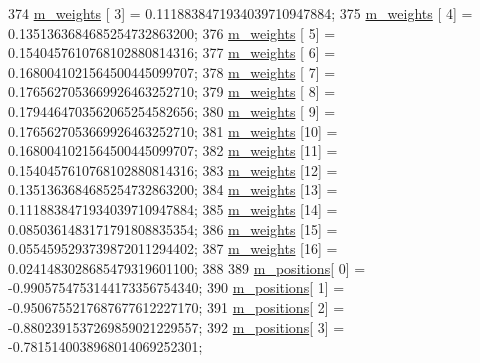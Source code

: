 \begin{DoxyCode}
374       \hyperlink{class_q_u_e_s_o_1_1_base1_d_quadrature_a7117fec020a8098d1c22b604268bad93}{m\_weights}  [ 3] =  0.1118838471934039710947884;
375       \hyperlink{class_q_u_e_s_o_1_1_base1_d_quadrature_a7117fec020a8098d1c22b604268bad93}{m\_weights}  [ 4] =  0.1351363684685254732863200;
376       \hyperlink{class_q_u_e_s_o_1_1_base1_d_quadrature_a7117fec020a8098d1c22b604268bad93}{m\_weights}  [ 5] =  0.1540457610768102880814316;
377       \hyperlink{class_q_u_e_s_o_1_1_base1_d_quadrature_a7117fec020a8098d1c22b604268bad93}{m\_weights}  [ 6] =  0.1680041021564500445099707;
378       \hyperlink{class_q_u_e_s_o_1_1_base1_d_quadrature_a7117fec020a8098d1c22b604268bad93}{m\_weights}  [ 7] =  0.1765627053669926463252710;
379       \hyperlink{class_q_u_e_s_o_1_1_base1_d_quadrature_a7117fec020a8098d1c22b604268bad93}{m\_weights}  [ 8] =  0.1794464703562065254582656;
380       \hyperlink{class_q_u_e_s_o_1_1_base1_d_quadrature_a7117fec020a8098d1c22b604268bad93}{m\_weights}  [ 9] =  0.1765627053669926463252710;
381       \hyperlink{class_q_u_e_s_o_1_1_base1_d_quadrature_a7117fec020a8098d1c22b604268bad93}{m\_weights}  [10] =  0.1680041021564500445099707;
382       \hyperlink{class_q_u_e_s_o_1_1_base1_d_quadrature_a7117fec020a8098d1c22b604268bad93}{m\_weights}  [11] =  0.1540457610768102880814316;
383       \hyperlink{class_q_u_e_s_o_1_1_base1_d_quadrature_a7117fec020a8098d1c22b604268bad93}{m\_weights}  [12] =  0.1351363684685254732863200;
384       \hyperlink{class_q_u_e_s_o_1_1_base1_d_quadrature_a7117fec020a8098d1c22b604268bad93}{m\_weights}  [13] =  0.1118838471934039710947884;
385       \hyperlink{class_q_u_e_s_o_1_1_base1_d_quadrature_a7117fec020a8098d1c22b604268bad93}{m\_weights}  [14] =  0.0850361483171791808835354;
386       \hyperlink{class_q_u_e_s_o_1_1_base1_d_quadrature_a7117fec020a8098d1c22b604268bad93}{m\_weights}  [15] =  0.0554595293739872011294402;
387       \hyperlink{class_q_u_e_s_o_1_1_base1_d_quadrature_a7117fec020a8098d1c22b604268bad93}{m\_weights}  [16] =  0.0241483028685479319601100;
388 
389       \hyperlink{class_q_u_e_s_o_1_1_base1_d_quadrature_aeda387c028c3ba89ea0f9637a2234212}{m\_positions}[ 0] = -0.9905754753144173356754340;
390       \hyperlink{class_q_u_e_s_o_1_1_base1_d_quadrature_aeda387c028c3ba89ea0f9637a2234212}{m\_positions}[ 1] = -0.9506755217687677612227170;
391       \hyperlink{class_q_u_e_s_o_1_1_base1_d_quadrature_aeda387c028c3ba89ea0f9637a2234212}{m\_positions}[ 2] = -0.8802391537269859021229557;
392       \hyperlink{class_q_u_e_s_o_1_1_base1_d_quadrature_aeda387c028c3ba89ea0f9637a2234212}{m\_positions}[ 3] = -0.7815140038968014069252301;

\end{DoxyCode}
